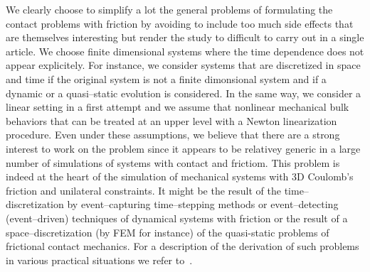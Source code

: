 We clearly choose to simplify a lot the general problems of formulating the contact problems with friction by avoiding to include too much side effects that are themselves interesting but render the study to difficult to carry out in a single article. We choose finite dimensional systems where the time dependence does not appear explicitely. For instance, we consider systems that are discretized in space and time if the original system is not a finite dimonsional system and if a dynamic or a quasi--static evolution is considered. In the same way, we consider a linear setting in a first attempt and we assume that  nonlinear mechanical bulk behaviors that can be treated at an upper level with a Newton linearization procedure. Even under these assumptions, we believe that there are a strong interest to work on the problem since it appears to be relativey generic in a large number of simulations of systems with contact and frictiom. This problem is indeed at the heart of the simulation of mechanical systems with 3D Coulomb's friction and unilateral constraints. It might be the result of the time--discretization by event--capturing time--stepping methods or event--detecting (event--driven) techniques of dynamical systems with friction or the result of a space--discretization (by FEM for instance) of the quasi-static problems of frictional contact mechanics. For a description of the derivation of such problems in various practical situations we refer to~\cite{Acary.Brogliato2008,Acary.Cadoux2013}.


